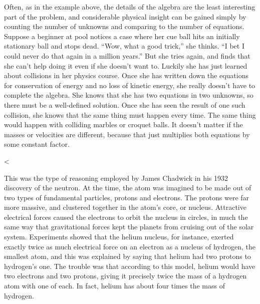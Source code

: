 Often, as in the example above, the details of the algebra
are the least interesting part of the problem, and
considerable physical insight can be gained simply by
counting the number of unknowns and comparing to the number
of equations. Suppose a beginner at pool notices a case
where her cue ball hits an initially stationary ball and
stops dead. ``Wow, what a good trick,'' she thinks. ``I bet
I could never do that again in a million years.'' But she
tries again, and finds that she can't help doing it even if
she doesn't want to. Luckily she has just learned about
collisions in her physics course. Once she has written down
the equations for conservation of energy and no loss of
kinetic energy, she really doesn't have to complete the
algebra. She knows that she has two equations in two
unknowns, so there must be a well-defined solution. Once she
has seen the result of one such collision, she knows that
the same thing must happen every time. The same thing would
happen with colliding marbles or croquet balls. It doesn't
matter if the masses or velocities are different, because
that just multiplies both equations by some constant factor.

<%

This was the type of reasoning employed by James Chadwick in his 1932 discovery of
the neutron. At the time, the
atom was imagined to be made out of two types of fundamental
particles, protons and electrons.
The protons were far more massive, and clustered together in
the atom's core, or nucleus. Attractive
electrical forces caused
the electrons to orbit the nucleus in circles, in much the
same way that gravitational forces kept the planets from
cruising out of the solar system. Experiments showed that
the helium nucleus, for instance, exerted exactly twice as
much electrical force on an electron as a nucleus of
hydrogen, the smallest atom, and this was explained by
saying that helium had two protons to hydrogen's one. The
trouble was that according to this model, helium would have
two electrons and two protons, giving it precisely twice the
mass of a hydrogen atom with one of each. In fact, helium
has about four times the mass of hydrogen.

